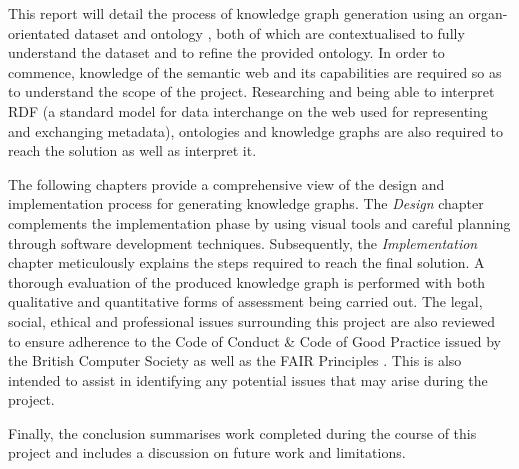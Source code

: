 This report will detail the process of knowledge graph generation using an organ-orientated dataset and ontology \cite{organontology}, both of which are contextualised to fully understand the dataset and to refine the provided ontology. In order to commence, knowledge of the semantic web and its capabilities are required so as to understand the scope of the project. Researching and being able to interpret RDF (a standard model for data interchange on the web \cite{gottschalk2021creation} used for representing and exchanging metadata), ontologies and knowledge graphs are also required to reach the solution as well as interpret it. 

The following chapters provide a comprehensive view of the design and implementation process for generating knowledge graphs. The \textit{Design} chapter complements the implementation phase by using visual tools and careful planning through software development techniques. Subsequently, the \textit{Implementation} chapter meticulously explains the steps required to reach the final solution. A thorough evaluation of the produced knowledge graph is performed with both qualitative and quantitative forms of assessment being carried out. The legal, social, ethical and professional issues surrounding this project are also reviewed to ensure adherence to the Code of Conduct \& Code of Good Practice issued by the British Computer Society \cite{bcs} as well as the FAIR Principles \cite{fairprinciples}. This is also intended to assist in identifying any potential issues that may arise during the project.

Finally, the conclusion summarises work completed during the course of this project and includes a discussion on future work and limitations. 
